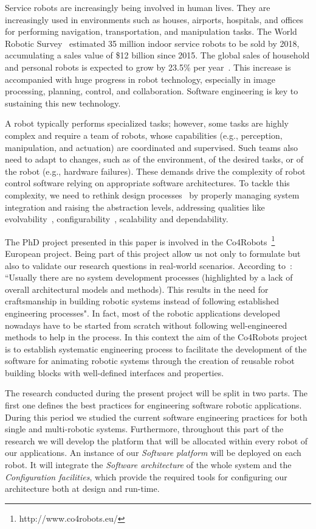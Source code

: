Service robots are increasingly being involved in human lives. 
They are increasingly used in environments such as houses, airports, hospitals, and offices for performing navigation, transportation, and manipulation tasks. 
The World Robotic Survey~\cite{wrs:online} estimated 35 million indoor service robots to be sold by 2018, accumulating a sales value of \$12 billion since 2015. 
The global sales of household and personal robots is expected to grow by 23.5\% per year~\cite{sheng:online}. 
This increase is accompanied with huge progress in robot technology, especially in image processing, planning, control, and collaboration. Software engineering is key to sustaining this new technology.

A robot typically performs specialized tasks; however, some tasks are highly complex and require a team of robots, whose capabilities (e.g., perception, manipulation, and actuation) are coordinated and supervised. 
Such teams also need to adapt to changes, such as of the environment, of the desired tasks, or of the robot (e.g., hardware failures). 
These demands drive the complexity of robot control software relying on appropriate software architectures. 
To tackle this complexity, we need to rethink design processes~\cite{Lee2008} by properly managing system integration and raising the abstraction levels, addressing qualities like evolvability~\cite{Perez2008}, configurability~\cite{Gamez2013563}, scalability and dependability.

The PhD project presented in this paper is involved in the Co4Robots~\footnote{http://www.co4robots.eu/} European project.
Being part of this project allow us not only to formulate but also to validate our research questions in real-world scenarios.
According to~\cite{roadmap}: ``Usually there are no system development processes (highlighted by a lack of overall architectural models and methods). 
This results in the need for craftsmanship in building robotic systems instead of following established engineering processes".
In fact, most of the robotic applications developed nowadays have to be started from scratch without following well-engineered methods to help in the process.
In this context the aim of the Co4Robots project is to establish systematic engineering process to facilitate the development of the software for animating robotic systems through the creation of reusable robot building blocks with well-defined interfaces and properties. 

The research conducted during the present project will be split in two parts.
The first one defines the best practices for engineering software robotic applications.
During this period we studied the current software engineering practices for both single and multi-robotic systems.
Furthermore, throughout this part of the research we will develop the platform that will be allocated within every robot of our applications.
An instance of our \emph{Software platform} will be deployed on each robot.
It will integrate the \emph{Software architecture} of the whole system and  the \emph{Configuration facilities}, which provide the required tools for configuring our architecture both at design and run-time.

